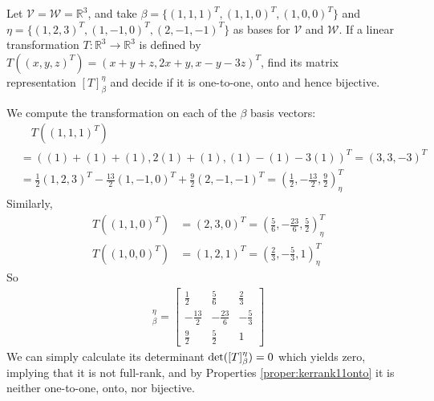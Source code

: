\begin{Exercise}
Let $\mathcal{V} = \mathcal{W} = \mathbb{R}^3$, and take $\mathcal{\beta} = \{(1,1,1)^T, (1,1,0)^T, (1,0,0)^T\}$ and $\mathcal{\eta} = \{(1,2,3)^T, (1,-1,0)^T, (2,-1,-1)^T\}$ as bases for $\mathcal{V}$ and $\mathcal{W}$. If a linear transformation $T: \mathbb{R}^3 \to \mathbb{R}^3$ is defined by $T((x,y,z)^T) = (x+y+z,2x+y,x-y-3z)^T$, find its matrix representation $[T]_{\beta}^{\eta}$ and decide if it is one-to-one, onto and hence bijective.
\end{Exercise}
\begin{Answer}
We compute the transformation on each of the $\beta$ basis vectors:
\begin{align*}
&\quad T((1,1,1)^T) \\
&= ((1)+(1)+(1),2(1)+(1),(1)-(1)-3(1))^T = (3,3,-3)^T \\
&= \frac{1}{2}(1,2,3)^T -\frac{13}{2}(1,-1,0)^T + \frac{9}{2}(2,-1,-1)^T = \left(\frac{1}{2}, -\frac{13}{2}, \frac{9}{2}\right)_\eta^T
\end{align*}
Similarly,
\begin{align*}
T((1,1,0)^T) &= (2,3,0)^T = \left(\frac{5}{6}, -\frac{23}{6}, \frac{5}{2}\right)_\eta^T \\  
T((1,0,0)^T) &= (1,2,1)^T = \left(\frac{2}{3}, -\frac{5}{3}, 1\right)_\eta^T
\end{align*}
So
\begin{align*}
[T]_{\beta}^{\eta} = 
\begin{bmatrix}
\frac{1}{2}&\frac{5}{6}&\frac{2}{3}\\ 
-\frac{13}{2}&-\frac{23}{6}&-\frac{5}{3}\\ 
\frac{9}{2}&\frac{5}{2}&1
\end{bmatrix}
\end{align*}
We can simply calculate its determinant $\det(\smash{[T]_{\beta}^{\eta}}) = 0$ which yields zero, implying that it is not full-rank, and by Properties \ref{proper:kerrank11onto} it is neither one-to-one, onto, nor bijective.
\end{Answer}

